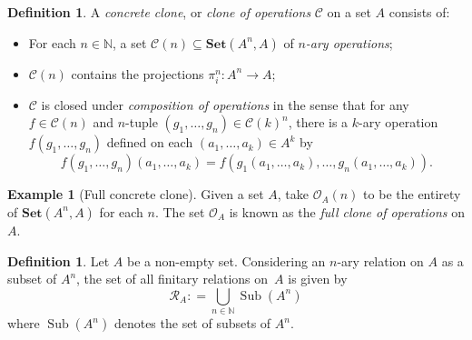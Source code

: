 \documentclass[11pt, a4paper, twoside,leqno]{amsart}
\newcommand{\cat}[1]{\mathbf{#1}}
\newcommand{\defeq}{\mathrel{\mathop:}=}
\renewcommand{\O}{{\mathcal O}}
\newcommand{\R}{{\mathcal R}}
\numberwithin{equation}{section}
\theoremstyle{plain}
\theoremstyle{definition}
\newtheorem{Defn}[Thm]{Definition}
\newtheorem{Ex}[Thm]{Example}
\newcommand{\Set}{\cat{Set}}
\DeclareMathOperator{\Sub}{Sub}
\begin{document}
\begin{Defn}
  \label{def:conc-clo}
  A \emph{concrete clone}, or  \emph{clone of operations} \(\mathscr{C}\) on a set \(A\) consists
  of:
  \begin{itemize}
  \item For each \(n\in \mathbb{N}
    \), a set \(\mathscr{C}(n) \subseteq \Set(A^{n},A)
    \) of \emph{\(n\)-ary operations};
  \item \(\mathscr{C}(n)\) contains the projections \(\pi_{i}^{n} \colon A^{n}
    \rightarrow A \);

  \item \(\mathscr{C}\) is closed under \emph{composition of operations} in the sense that
    for any \(f \in \mathscr{C}(n)
    \) and \(n\)-tuple \((g_{1},\dotsc,g_{n}) \in \mathscr{C}(k)^{n}
    \), there is a \(k\)-ary
    operation \(f(g_{1},\dots,g_{n})\)
    defined on each \((a_{1},\dotsc,a_{k})\in A^{k}\) by
    \begin{equation}
      \label{eq:15}
      f(g_{1},\dotsc,g_{n})(a_{1},\dotsc,a_{k}) = f(g_{1}(a_{1},\dotsc,a_{k}),\dotsc,g_{n}(a_{1},\dotsc,a_{k})).
    \end{equation}
  \end{itemize}
\end{Defn}

\begin{Ex}[Full concrete clone]
  \label{ex:full-cc}
  Given a set \(A\), take \(\mathscr{O}_{A}(n)\) to be the entirety of 
  \(\Set(A^{n},A)\) for each \(n\). 
  The set \(\mathscr{O}_{A}\) is known as the
  \emph{full clone of operations}
  on \(A\). 
\end{Ex}




\begin{Defn}
  \label{def:all-rels-on-set}
  Let \(A\) be a non-empty set. Considering an \(n\)-ary relation on \(A\) as a
  subset of \(A^{n}\), the set of all finitary relations on~\(A\) is
  given by
  \begin{equation*}
    \R_{A}\defeq \bigcup\limits_{n\in \mathbb{N}}
    \Sub(A^{n})
  \end{equation*}
  where \(\Sub(A^{n})\) denotes the set of subsets of \(A^{n}\).
\end{Defn}
\end{document}
